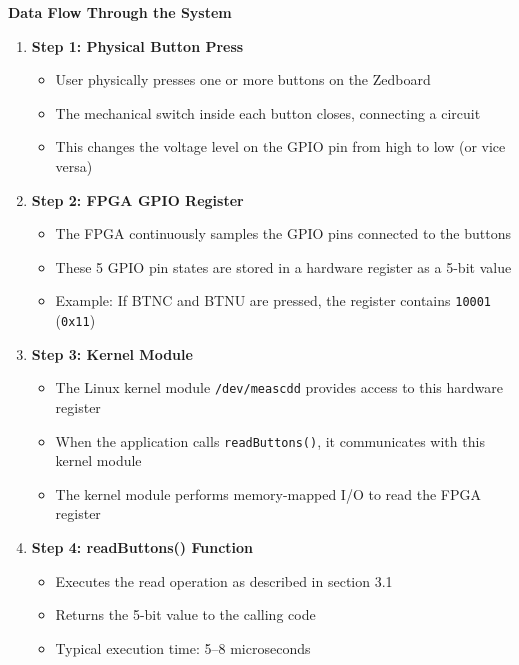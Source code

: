 \textbf{Data Flow Through the System}
\begin{enumerate}
    \item \textbf{Step 1: Physical Button Press}
    \begin{itemize}
        \item User physically presses one or more buttons on the Zedboard
        \item The mechanical switch inside each button closes, connecting a circuit
        \item This changes the voltage level on the GPIO pin from high to low (or vice versa)
    \end{itemize}

    \item \textbf{Step 2: FPGA GPIO Register}
    \begin{itemize}
        \item The FPGA continuously samples the GPIO pins connected to the buttons
        \item These 5 GPIO pin states are stored in a hardware register as a 5-bit value
        \item Example: If BTNC and BTNU are pressed, the register contains \texttt{10001} (\texttt{0x11})
    \end{itemize}

    \item \textbf{Step 3: Kernel Module}
    \begin{itemize}
        \item The Linux kernel module \texttt{/dev/meascdd} provides access to this hardware register
        \item When the application calls \texttt{readButtons()}, it communicates with this kernel module
        \item The kernel module performs memory-mapped I/O to read the FPGA register
    \end{itemize}

    \item \textbf{Step 4: readButtons() Function}
    \begin{itemize}
        \item Executes the read operation as described in section 3.1
        \item Returns the 5-bit value to the calling code
        \item Typical execution time: 5--8 microseconds
    \end{itemize}


\end{enumerate}
